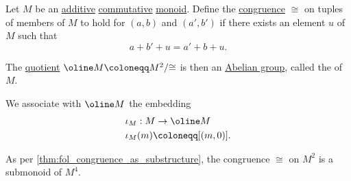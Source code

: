 \begin{definition}\label{def:group_of_differences}
  Let \( M \) be an \hyperref[def:additive_semigroup]{additive} \hyperref[def:binary_operation/commutative]{commutative} \hyperref[def:monoid]{monoid}. Define the \hyperref[def:fol_congruence]{congruence} \( \cong \) on tuples of members of \( M \) to hold for \( (a, b) \) and \( (a', b') \) if there exists an element \( u \) of \( M \) such that
  \begin{equation*}
    a + b' + u = a' + b + u.
  \end{equation*}

  The \hyperref[def:fol_quotient_structure]{quotient} \( \oline M \coloneqq M^2 / {\cong} \) is then an \hyperref[def:abelian_group]{Abelian group}, called the  of \( M \).

  We associate with \( \oline M \) the embedding
  \begin{equation*}
    \begin{aligned}
      &\iota_M: M \to \oline M \\
      &\iota_M(m) \coloneqq [(m, 0)].
    \end{aligned}
  \end{equation*}
\end{definition}
\begin{comments}
  \item As per \cref{thm:fol_congruence_as_substructure}, the congruence \( {\cong} \) on \( M^2 \) is a submonoid of \( M^4 \).
\end{comments}
